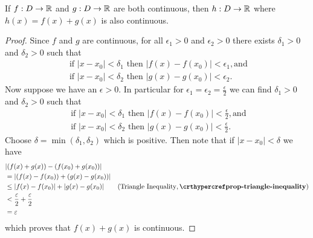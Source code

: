 \begin{proposition}\label{prop-sum-of-continuous-functions-is-continuous}
    If $f: D \to \mathbb{R}$ and $g: D \to \mathbb{R}$ are both continuous, then $h: D \to \mathbb{R}$ where $h(x) = f(x) + g(x)$ is also continuous.
\end{proposition}
\begin{proof}
    Since $f$ and $g$ are continuous, for all $\epsilon_1 > 0$ and $\epsilon_2 > 0$ there exists $\delta_1 > 0$ and $\delta_2 > 0$ such that
    \begin{gather*}
        \text{ if } |x - x_0| < \delta_1 \text{ then } |f(x) - f(x_0)| < \epsilon_1, \text{and}\\
        \text{ if } |x - x_0| < \delta_2 \text{ then } |g(x) - g(x_0)| < \epsilon_2.
    \end{gather*}
    Now suppose we have an $\epsilon > 0$. In particular for $\epsilon_1 = \epsilon_2 = \frac\epsilon2$ we can find $\delta_1 > 0$ and $\delta_2 > 0$ such that
    \begin{gather*}
        \text{ if } |x - x_0| < \delta_1 \text{ then } |f(x) - f(x_0)| < \frac\epsilon2, \text{and}\\
        \text{ if } |x - x_0| < \delta_2 \text{ then } |g(x) - g(x_0)| < \frac\epsilon2.
    \end{gather*}
    Choose $\delta = \min(\delta_1, \delta_2)$ which is positive. Then note that if $|x - x_0| < \delta$ we have
    \begin{align*}
        &|(f(x) + g(x)) - (f(x_0) + g(x_0))|\\
        &= |(f(x) - f(x_0)) + (g(x) - g(x_0))|\\
        &\leq |f(x) - f(x_0)| + |g(x) - g(x_0)| & (\text{Triangle Inequality}, \myref{prop-triangle-inequality})\\
        &< \frac\epsilon2 + \frac\epsilon2\\
        &= \epsilon
    \end{align*}
    which proves that $f(x) + g(x)$ is continuous.
\end{proof}

